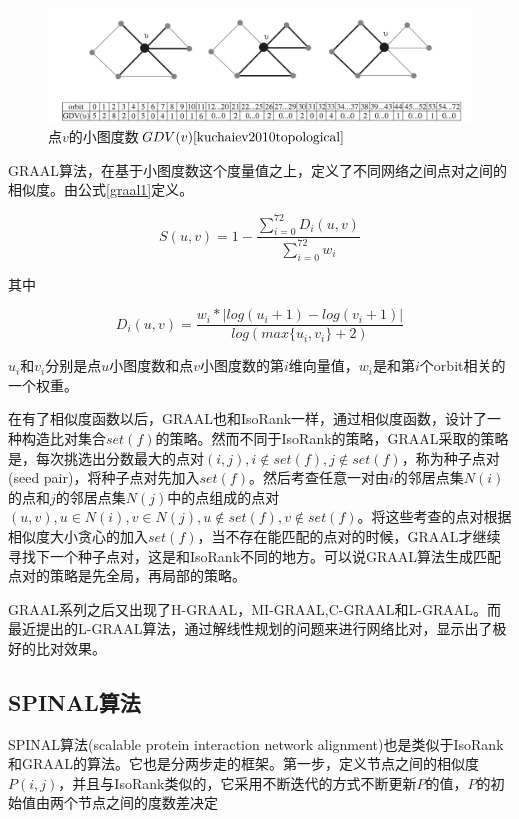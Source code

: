 \begin{figure}[htbp]
\centering
\includegraphics[width=\textwidth]{pic/orbitcount.png}
\captionsetup{margin=50pt}
\caption{点$v$的小图度数$GDV(v)\cite{kuchaiev2010topological}$}\label{fig:orbitcount}
\end{figure}

GRAAL算法，在基于小图度数这个度量值之上，定义了不同网络之间点对之间的相似度。由公式\ref{graal1}定义。

\begin{equation}\label{graal1}
S(u,v)=1-\frac{\sum_{i=0}^{72}D_i(u,v)}{\sum_{i=0}^{72}w_i}
\end{equation}

其中

\begin{equation}\label{graal2}
D_i(u,v)=\frac{w_i*\left | log(u_i+1)-log(v_i+1) \right |}{log(max\{u_i,v_i\}+2)}
\end{equation}

$u_i$和$v_i$分别是点$u$小图度数和点$v$小图度数的第$i$维向量值，$w_i$是和第$i$个orbit相关的一个权重。

在有了相似度函数以后，GRAAL也和IsoRank一样，通过相似度函数，设计了一种构造比对集合$set(f)$的策略。然而不同于IsoRank的策略，GRAAL采取的策略是，每次挑选出分数最大的点对$(i,j),i\notin set(f),j\notin set(f)$，称为种子点对(seed pair)，将种子点对先加入$set(f)$。然后考查任意一对由$i$的邻居点集$N(i)$的点和$j$的邻居点集$N(j)$中的点组成的点对$(u,v),u\in N(i),v\in N(j),u\notin set(f),v\notin set(f)$。将这些考查的点对根据相似度大小贪心的加入$set(f)$，当不存在能匹配的点对的时候，GRAAL才继续寻找下一个种子点对，这是和IsoRank不同的地方。可以说GRAAL算法生成匹配点对的策略是先全局，再局部的策略。

GRAAL系列之后又出现了H-GRAAL\cite{milenkovic2010optimal}，MI-GRAAL\cite{kuchaiev2011integrative},C-GRAAL\cite{memivsevic2012c}和L-GRAAL\cite{malod2015graal}。而最近提出的L-GRAAL\cite{malod2015graal}算法，通过解线性规划的问题来进行网络比对，显示出了极好的比对效果。

\subsection{SPINAL算法}
SPINAL算法(scalable protein interaction network alignment)也是类似于IsoRank和GRAAL的算法。它也是分两步走的框架。第一步，定义节点之间的相似度$P(i,j)$，并且与IsoRank类似的，它采用不断迭代的方式不断更新$P$的值，$P$的初始值由两个节点之间的度数差决定

